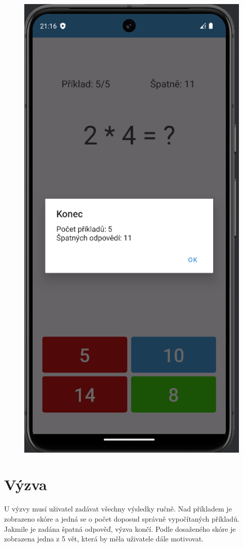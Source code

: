 \documentclass[12pt]{report}
\begin{document}
\begin{figure}[ht]
\begin{minipage}{.5\textwidth}
			\includegraphics[height=1.7\textwidth]{img/exercise_2}
			\label{fig:exercise_2}
		\end{minipage}
	\end{figure}
	
	\newpage
	\section{Výzva}
	U výzvy musí uživatel zadávat všechny výsledky ručně. Nad příkladem je zobrazeno skóre a jedná se o počet doposud správně vypočítaných příkladů. Jakmile je zadána špatná odpověď, výzva končí. Podle dosaženého skóre je zobrazena jedna z 5 vět, která by měla uživatele dále motivovat.
	
\end{document}
